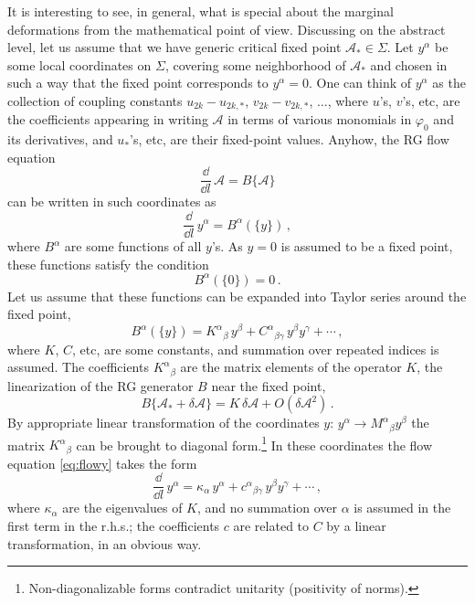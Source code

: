 It is interesting to see, in general, what is special about the marginal
deformations from the mathematical point of view. Discussing on the abstract
level, let us assume that we have generic critical fixed point
$\mathcal A_*\in\Sigma$. Let $y^\alpha$ be some local coordinates on $\Sigma$,
covering some neighborhood of $\mathcal A_*$ and chosen in such a way that the
fixed point corresponds to $y^\alpha=0$. One can think of $y^\alpha$ as the
collection of coupling constants $u_{2k}-u_{2k,*}$, $v_{2k}-v_{2k,*}$, $\dots$,
where $u$'s, $v$'s, etc, are the coefficients appearing in writing $\mathcal A$ in
terms of various monomials in $\varphi_0$ and its derivatives, and $u_*$'s, etc,
are their fixed-point values. Anyhow, the RG flow equation
\[
\frac{\dd}{\dd l}\,\mathcal A=B\{\mathcal A\}
\]
can be written in such coordinates as
\begin{equation}\label{eq:flowy}
\frac{\dd}{\dd l}\,y^\alpha=B^\alpha(\{y\})\,,
\end{equation}
where $B^\alpha$ are some functions of all $y$'s. As $y=0$ is assumed to be a fixed
point, these functions satisfy the condition
\[
B^\alpha(\{0\})=0\,.
\]
Let us assume that these functions can be expanded into Taylor series around the
fixed point,
\[
B^\alpha(\{y\})=K^\alpha{}_\beta\,y^\beta+C^\alpha{}_{\beta\gamma}\,y^\beta y^\gamma+\cdots\,,
\]
where $K$, $C$, etc, are some constants, and summation over repeated indices is
assumed. The coefficients $K^\alpha{}_\beta$ are the matrix elements of the operator
$K$, the linearization of the RG generator $B$ near the fixed point,
\[
B\{\mathcal A_*+\delta\mathcal A\}=K\,\delta\mathcal A+O(\delta\mathcal A^2)\,.
\]
By appropriate linear transformation of the coordinates $y$:
$y^\alpha\to M^\alpha{}_\beta y^\beta$ the matrix $K^\alpha{}_\beta$ can be brought to
diagonal form.\footnote{Non-diagonalizable forms contradict unitarity (positivity
of norms).} In these coordinates the flow equation \eqref{eq:flowy} takes the form
\begin{equation}\label{eq:flowdiag}
\frac{\dd}{\dd l}\,y^\alpha=\kappa_\alpha\,y^\alpha+c^\alpha{}_{\beta\gamma}\,y^\beta y^\gamma+\cdots\,,
\end{equation}
where $\kappa_\alpha$ are the eigenvalues of $K$, and no summation over $\alpha$ is
assumed in the first term in the r.h.s.; the coefficients $c$ are related to $C$
by a linear transformation, in an obvious way.

